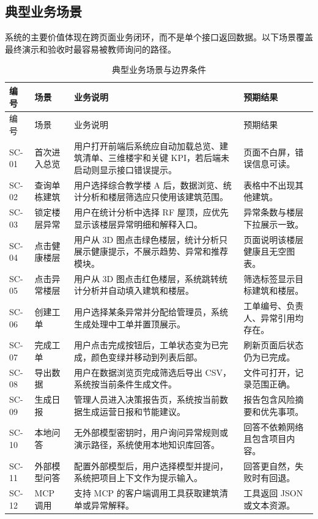 \documentclass[12pt,a4paper]{ctexart}
\begin{document}
\subsection{典型业务场景}
系统的主要价值体现在跨页面业务闭环，而不是单个接口返回数据。以下场景覆盖最终演示和验收时最容易被教师询问的路径。
\begin{longtable}{L{1.6cm}L{3.0cm}L{6.2cm}L{4.4cm}}
\caption{典型业务场景与边界条件}\\
\toprule
编号 & 场景 & 业务说明 & 预期结果 \\
\midrule
\endfirsthead
\toprule
编号 & 场景 & 业务说明 & 预期结果 \\
\midrule
\endhead
SC-01 & 首次进入总览 & 用户打开前端后系统应自动加载总览、建筑清单、三维楼宇和关键 KPI，若后端未启动则显示接口错误提示。 & 页面不白屏，错误信息可读。 \\
SC-02 & 查询单栋建筑 & 用户选择综合教学楼 A 后，数据浏览、统计分析和楼层筛选应只使用该建筑范围。 & 表格中不出现其他建筑。 \\
SC-03 & 锁定楼层异常 & 用户在统计分析中选择 RF 屋顶，应优先显示该楼层异常明细和解释入口。 & 异常条数与楼层下拉展示一致。 \\
SC-04 & 点击健康楼层 & 用户从 3D 图点击绿色楼层，统计分析只展示健康提示，不展示趋势、异常和推荐模块。 & 页面说明该楼层健康且无空图表。 \\
SC-05 & 点击异常楼层 & 用户从 3D 图点击红色楼层，系统跳转统计分析并自动填入建筑和楼层。 & 筛选标签显示目标建筑和楼层。 \\
SC-06 & 创建工单 & 用户选择某条异常并分配给管理员，系统生成处理中工单并置顶展示。 & 工单编号、负责人、异常引用均存在。 \\
SC-07 & 完成工单 & 用户点击完成按钮后，工单状态变为已完成，颜色变绿并移动到列表后部。 & 刷新页面后状态仍为已完成。 \\
SC-08 & 导出数据 & 用户在数据浏览页完成筛选后导出 CSV，系统按当前条件生成文件。 & 文件可打开，记录范围正确。 \\
SC-09 & 生成日报 & 管理人员进入决策报告页，系统按当前数据生成运营日报和节能建议。 & 报告包含风险摘要和优先事项。 \\
SC-10 & 本地问答 & 无外部模型密钥时，用户询问异常规则或演示路径，系统使用本地知识库回答。 & 回答不依赖网络且包含项目内容。 \\
SC-11 & 外部模型问答 & 配置外部模型后，用户选择模型并提问，系统把项目上下文作为提示输入。 & 回答更自然，失败时有回退。 \\
SC-12 & MCP 调用 & 支持 MCP 的客户端调用工具获取建筑清单或异常解释。 & 工具返回 JSON 或文本资源。 \\

\end{longtable}
\end{document}
